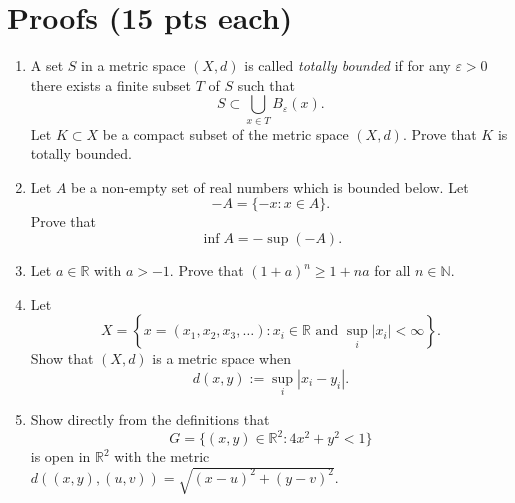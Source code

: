 \documentclass[11pt]{article}
\newcommand{\proofspace}{\vspace{3in}}
\begin{document}
\newpage
\section*{Proofs (15 pts each)}

\begin{enumerate}
    \item A set $S$ in a metric space $(X,d)$ is called \emph{totally bounded} if for any $\varepsilon > 0$ there exists a finite subset $T$ of $S$ such that
    \[
        S \subset \bigcup_{x \in T} B_\varepsilon(x).
    \]
    Let $K \subset X$ be a compact subset of the metric space $(X,d)$. Prove that $K$ is totally bounded.
    \proofspace
    \newpage

    \item Let $A$ be a non-empty set of real numbers which is bounded below. Let
    \[
        -A = \{ -x : x \in A \}.
    \]
    Prove that
    \[
        \inf A = -\sup(-A).
    \]
    \proofspace
    \newpage

    \item Let $a \in \mathbb{R}$ with $a > -1$. Prove that $(1+a)^n \geq 1 + na$ for all $n \in \mathbb{N}$.
    \proofspace
    \newpage

    \item Let
    \[
        X = \left\{ x = (x_1, x_2, x_3, \ldots) : x_i \in \mathbb{R} \text{ and } \sup_i |x_i| < \infty \right\}.
    \]
    Show that $(X,d)$ is a metric space when
    \[
        d(x,y) := \sup_i |x_i - y_i|.
    \]
    \proofspace
    \newpage

    \item Show directly from the definitions that
    \[
        G = \{ (x,y) \in \mathbb{R}^2 : 4x^2 + y^2 < 1 \}
    \]
    is open in $\mathbb{R}^2$ with the metric $d((x,y),(u,v)) = \sqrt{(x-u)^2 + (y-v)^2}$.
    \proofspace
\end{enumerate}
\end{document}
